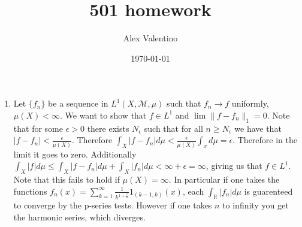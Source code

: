\documentclass[12pt, letterpaper]{article}
\date{\today}
\author{Alex Valentino}
\title{501 homework}
\newcommand{\R}{\mathbb{R}}
\begin{document}
\begin{enumerate}
	\item[7] Let $\{f_n\}$ be a sequence in $L^1(X, \mathcal{M},\mu)$ such that $f_n \to f$ uniformly, $\mu(X) < \infty$.
	We want to show that $f \in L^1$ and $\lim \|f - f_n\|_1 = 0$.  Note that for some $\epsilon > 0$ there exists 
	$N_\epsilon$ such that for all $n \geq N_\epsilon$ we have that $|f - f_n| < \frac{\epsilon}{\mu(X)}$.  
	Therefore $\int_X |f - f_n| d\mu < \frac{\epsilon}{\mu(X)} \int_x d \mu = \epsilon$.  Therefore in the limit it goes 
	to zero.  Additionally $\int_X |f| d \mu \leq \int_X |f - f_n| d \mu + \int_X |f_n| d \mu < \infty + \epsilon =
	 \infty$, giving us that $f \in L^1$.  Note that this fails to hold if $\mu(X) = \infty$.  In particular if one 
	 takes the functions $f_n(x) = \sum_{k=1}^\infty \frac{1}{k^{1+\frac{1}{n}}}1_{(k-1,k)}(x)$, each $\int_\R |f_n| d \mu$ is guarenteed to converge by the p-series tests.  However if one takes $n$ to infinity you get the harmonic series,
	 which diverges.  
	

\end{enumerate}
\end{document}
